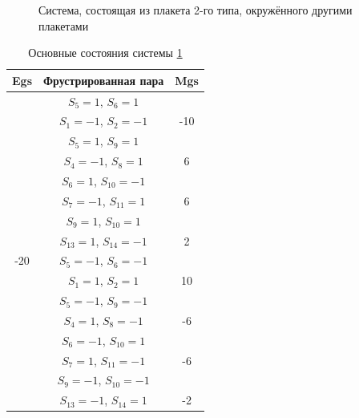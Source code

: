 \documentclass[utf8, babel, sor, jor, amsmath, amssymb, reprint]{elsarticle} %
\begin{document}
\begin{figure}[H]
	\centering
{}
	\caption{Система, состоящая из плакета 2-го типа, окружённого другими плакетами}
	\label{fig:4x4}
\end{figure}

\begin{table}[H]
	\centering
	\begin{tabular}{|c|c|c|}
		\hline
		Egs   &   Фрустрированная пара & Mgs \\
		\hline
		&  $S_5=1$, $S_6=1$& \\
		&    $S_1=-1$, $S_2=-1$ & -10\\
		\cline{2-3}
		&  $S_5=1$, $S_9=1$& \\
		&    $S_4=-1$, $S_8=1$& 6\\
		\cline{2-3}
		&  $S_6=1$, $S_{10}=-1$&\\
		&    $S_7=-1$, $S_{11}=1$& 6\\
		\cline{2-3}
		&  $S_9=1$, $S_{10}=1$&\\
		&    $S_{13}=1$, $S_{14}=-1$& 2\\
		\cline{2-3}
		-20	\multirow{3}{*}{}
		&  $S_5=-1$, $S_6=-1$&\\
		&    $S_1=1$, $S_2=1$& 10\\
		\cline{2-3}
		&  $S_5=-1$, $S_9=-1$&\\
		&    $S_4=1$, $S_8=-1$& -6\\
		\cline{2-3}
		&  $S_6=-1$, $S_{10}=1$&\\
		&    $S_7=1$, $S_{11}=-1$& -6\\
		\cline{2-3}
		&  $S_9=-1$, $S_{10}=-1$&\\
		&    $S_{13}=-1$, $S_{14}=1$& -2\\
		\hline
	\end{tabular}
	\caption{Основные состояния системы \ref{fig:4x4}}
	\label{tab:gs_4x4}
\end{table}
\end{document}
